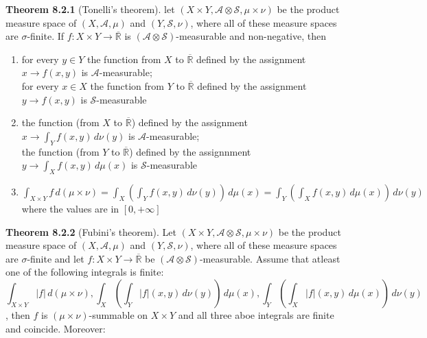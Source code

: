 \documentclass[a4paper,14pt]{extarticle}
\theoremstyle{definition}
\begin{document}
\vspace{12pt}

\noindent\textbf{Theorem 8.2.1} (Tonelli's theorem). let $(X\times Y,\mathcal{A}\otimes\mathcal{S},\mu\times\nu)$ be the product measure space of $(X,\mathcal{A},\mu)$ and $(Y,\mathcal{S},\nu)$, where all of these measure spaces are $\sigma$-finite. If $f:X\times Y\rightarrow\overline{\mathbb{R}}$ is $(\mathcal{A}\otimes\mathcal{S})$-measurable and non-negative, then 
\begin{enumerate}
  \item for every $y\in Y$ the function from $X$ to $\overline{\mathbb{R}}$ defined by the assignment $x\rightarrow f(x,y)$ is $\mathcal{A}$-measurable; \\ for every $x\in X$ the function from $Y$ to $\overline{\mathbb{R}}$ defined by the assignment $y\rightarrow f(x,y)$ is $\mathcal{S}$-measurable
  \item the function (from $X$ to $\overline{\mathbb{R}}$) defined by the assignment $x\rightarrow\int_Y f(x,y) \,d\nu(y)$ is $\mathcal{A}$-measurable; \\ the function (from $Y$ to $\overline{\mathbb{R}}$) defined by the assignnment $y\rightarrow\int_X f(x,y) \,d\mu(x)$ is $\mathcal{S}$-measurable
  \item $\int_{X\times Y} f \,d(\mu\times \nu)=\int_X\left(\int_Y f(x,y) \,d\nu(y)\right) \,d\mu(x)=\int_Y\left(\int_X f(x,y) \,d\mu(x)\right) \,d\nu(y)$ where the values are in $[0,+\infty]$
\end{enumerate}
\noindent\textbf{Theorem 8.2.2} (Fubini's theorem). Let $(X\times Y,\mathcal{A}\otimes\mathcal{S},\mu\times\nu)$ be the product measure space of $(X,\mathcal{A},\mu)$ and $(Y,\mathcal{S},\nu)$, where all of these measure spaces are $\sigma$-finite and let $f:X\times Y\rightarrow\overline{\mathbb{R}}$ be $(\mathcal{A}\otimes\mathcal{S})$-measurable. Assume that atleast one of the following integrals is finite:
\[\int_{X\times Y} |f| \,d(\mu\times\nu),
\int_X\left(\int_Y |f|(x,y) \,d\nu(y)\right) \,d\mu(x), \int_Y\left(\int_X |f|(x,y) \,d\mu(x)\right) \,d\nu(y)\],
then $f$ is $(\mu\times\nu)$-summable on $X\times Y$ and all three aboe integrals are finite and coincide. Moreover:
\end{document}
